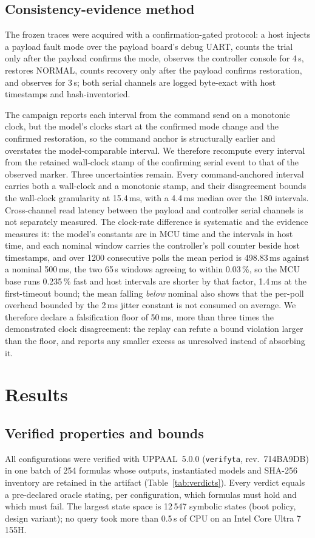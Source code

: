 \documentclass[conference,a4paper]{IEEEtran}
\begin{document}
\subsection{Consistency-evidence method}
\label{sec:confmethod}
The frozen traces were acquired with a confirmation-gated protocol: a host injects a payload fault mode over the payload board's debug UART, counts the trial only after the payload confirms the mode, observes the controller console for 4\,s, restores NORMAL, counts recovery only after the payload confirms restoration, and observes for 3\,s; both serial channels are logged byte-exact with host timestamps and hash-inventoried. 

The campaign reports each interval from the command send on a monotonic clock, but the model's clocks start at the confirmed mode change and the confirmed restoration, so the command anchor is structurally earlier and overstates the model-comparable interval. We therefore recompute every interval from the retained wall-clock stamp of the confirming serial event to that of the observed marker. Three uncertainties remain. Every command-anchored interval carries both a wall-clock and a monotonic stamp, and their disagreement bounds the wall-clock granularity at 15.4\,ms, with a 4.4\,ms median over the 180 intervals. Cross-channel read latency between the payload and controller serial channels is not separately measured. The clock-rate difference is systematic and the evidence measures it: the model's constants are in MCU time and the intervals in host time, and each nominal window carries the controller's poll counter beside host timestamps, and over 1200 consecutive polls the mean period is 498.83\,ms against a nominal 500\,ms, the two 65\,s windows agreeing to within 0.03\,\%, so the MCU base runs 0.235\,\% fast and host intervals are shorter by that factor, 1.4\,ms at the first-timeout bound; the mean falling \emph{below} nominal also shows that the per-poll overhead bounded by the 2\,ms jitter constant is not consumed on average. We therefore declare a falsification floor of 50\,ms, more than three times the demonstrated clock disagreement: the replay can refute a bound violation larger than the floor, and reports any smaller excess as unresolved instead of absorbing it.


\section{Results}
\label{sec:results}
\subsection{Verified properties and bounds}
All configurations were verified with UPPAAL~5.0.0 (\texttt{verifyta}, rev.\ 714BA9DB) in one batch of 254 formulas whose outputs, instantiated models and SHA-256 inventory are retained in the artifact (Table~\ref{tab:verdicts}). Every verdict equals a pre-declared oracle stating, per configuration, which formulas must hold and which must fail. The largest state space is 12\,547 symbolic states (boot policy, design variant); no query took more than 0.5\,s of CPU on an Intel Core Ultra 7 155H.
\end{document}

